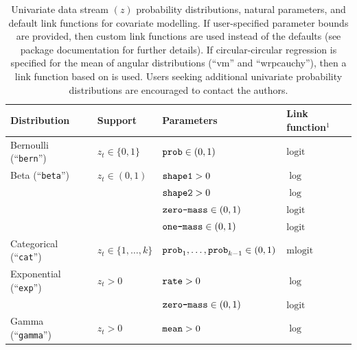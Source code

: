 \documentclass[12pt]{article}\usepackage[]{graphicx}\usepackage[]{color}
\begin{document}
\begin{small}
\begin{table}
  \caption{\label{tab:unipdfs} Univariate data stream $(z)$ probability distributions, natural parameters, and default link functions for covariate modelling. If user-specified parameter bounds are provided, then custom link functions are used instead of the defaults (see package documentation for further details). %
If circular-circular regression is specified for the mean of angular distributions (``vm'' and ``wrpcauchy''), then a link function based on \cite{RivestEtAl2016} is used. Users seeking additional univariate probability distributions are encouraged to contact the authors.}
  \begin{tabular}{llll}
  \toprule
  Distribution                                & Support                       & Parameters                                      & Link function$^1$ \tabularnewline
  \midrule
  \rowcolor{Gray} Bernoulli (``\verb|bern|'') & $z_t\in\{0,1\}$               & $\verb|prob|\in(0,1)$                           &  $\text{logit}$ \tabularnewline  
  Beta (``\verb|beta|'')                      & $z_t\in(0,1)$                 & $\verb|shape1|>0$                               &  $\log$ \tabularnewline  
                                              &                               & $\verb|shape2|>0$                               &  $\log$ \tabularnewline
                                              &                               & $\verb|zero-mass|\in(0,1)$                      &  $\text{logit}$ \tabularnewline 
                                              &                               & $\verb|one-mass|\in(0,1)$                       &  $\text{logit}$ \tabularnewline 
  \rowcolor{Gray} Categorical (``\verb|cat|'')& $z_t\in\{1,\ldots,k\}$        & $\verb|prob|_1,\ldots,\verb|prob|_{k-1}\in(0,1)$&  $\text{mlogit}$ \tabularnewline    
  Exponential (``\verb|exp|'')                & $z_t>0$                       & $\verb|rate|>0$                                 &  $\log$ \tabularnewline  
                                              &                               & $\verb|zero-mass|\in(0,1)$                      &  $\text{logit}$ \tabularnewline 
  \rowcolor{Gray} Gamma (``\verb|gamma|'')    & $z_t>0$                       & $\verb|mean|>0$                                 &  $\log$ \tabularnewline  

\end{tabular}
\end{table}
\end{small}
\end{document}
